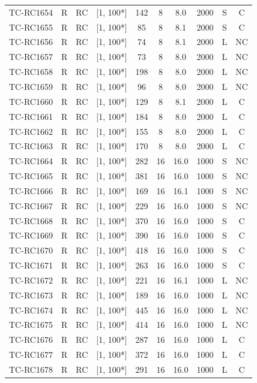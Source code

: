 \begin{longtable}{lccccccccc}
TC-RC1654 & R & RC & [1, 100*] & 142 & 8 & 8.0 & 2000 & S & C \\
TC-RC1655 & R & RC & [1, 100*] & 85 & 8 & 8.1 & 2000 & S & C \\
TC-RC1656 & R & RC & [1, 100*] & 74 & 8 & 8.1 & 2000 & L & NC \\
TC-RC1657 & R & RC & [1, 100*] & 73 & 8 & 8.0 & 2000 & L & NC \\
TC-RC1658 & R & RC & [1, 100*] & 198 & 8 & 8.0 & 2000 & L & NC \\
TC-RC1659 & R & RC & [1, 100*] & 96 & 8 & 8.0 & 2000 & L & NC \\
TC-RC1660 & R & RC & [1, 100*] & 129 & 8 & 8.1 & 2000 & L & C \\
TC-RC1661 & R & RC & [1, 100*] & 184 & 8 & 8.0 & 2000 & L & C \\
TC-RC1662 & R & RC & [1, 100*] & 155 & 8 & 8.0 & 2000 & L & C \\
TC-RC1663 & R & RC & [1, 100*] & 170 & 8 & 8.0 & 2000 & L & C \\
TC-RC1664 & R & RC & [1, 100*] & 282 & 16 & 16.0 & 1000 & S & NC \\
TC-RC1665 & R & RC & [1, 100*] & 381 & 16 & 16.0 & 1000 & S & NC \\
TC-RC1666 & R & RC & [1, 100*] & 169 & 16 & 16.1 & 1000 & S & NC \\
TC-RC1667 & R & RC & [1, 100*] & 229 & 16 & 16.0 & 1000 & S & NC \\
TC-RC1668 & R & RC & [1, 100*] & 370 & 16 & 16.0 & 1000 & S & C \\
TC-RC1669 & R & RC & [1, 100*] & 390 & 16 & 16.0 & 1000 & S & C \\
TC-RC1670 & R & RC & [1, 100*] & 418 & 16 & 16.0 & 1000 & S & C \\
TC-RC1671 & R & RC & [1, 100*] & 263 & 16 & 16.0 & 1000 & S & C \\
TC-RC1672 & R & RC & [1, 100*] & 221 & 16 & 16.1 & 1000 & L & NC \\
TC-RC1673 & R & RC & [1, 100*] & 189 & 16 & 16.0 & 1000 & L & NC \\
TC-RC1674 & R & RC & [1, 100*] & 445 & 16 & 16.0 & 1000 & L & NC \\
TC-RC1675 & R & RC & [1, 100*] & 414 & 16 & 16.0 & 1000 & L & NC \\
TC-RC1676 & R & RC & [1, 100*] & 287 & 16 & 16.0 & 1000 & L & C \\
TC-RC1677 & R & RC & [1, 100*] & 372 & 16 & 16.0 & 1000 & L & C \\
TC-RC1678 & R & RC & [1, 100*] & 291 & 16 & 16.0 & 1000 & L & C \\

\end{longtable}
